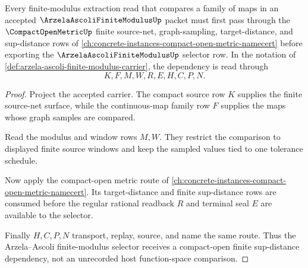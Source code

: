 \begin{theorem}
\label{thm:arzela-ascoli-finite-modulus-compact-open-dependency}
Every finite-modulus extraction read that compares a family of maps in an accepted $\ArzelaAscoliFiniteModulusUp$ packet must first pass through the $\CompactOpenMetricUp$ finite source-net, graph-sampling, target-distance, and sup-distance rows of \autoref{ch:concrete-instances-compact-open-metric-namecert} before exporting the $\ArzelaAscoliFiniteModulusUp$ selector row. In the notation of \autoref{def:arzela-ascoli-finite-modulus-carrier}, the dependency is read through
$$
K,F,M,W,R,E,H,C,P,N .
$$
\end{theorem}
\begin{proof}
Project the accepted carrier. The compact source row $K$ supplies the finite source-net surface, while the continuous-map family row $F$ supplies the maps whose graph samples are compared.

Read the modulus and window rows $M,W$. They restrict the comparison to displayed finite source windows and keep the sampled values tied to one tolerance schedule.

Now apply the compact-open metric route of \autoref{ch:concrete-instances-compact-open-metric-namecert}. Its target-distance and finite sup-distance rows are consumed before the regular rational readback $R$ and terminal seal $E$ are available to the selector.

Finally $H,C,P,N$ transport, replay, source, and name the same route. Thus the Arzela--Ascoli finite-modulus selector receives a compact-open finite sup-distance dependency, not an unrecorded host function-space comparison.
\end{proof}

